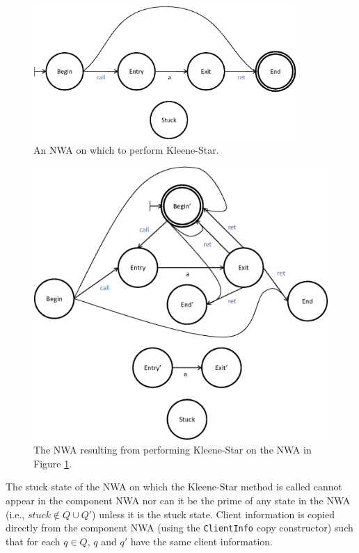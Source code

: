 \documentclass{llncs}
\begin{document}
\begin{figure}[p]
  \centering
    \includegraphics[width=10cm]{Figures/Figure11.eps}
  \caption{An NWA on which to perform Kleene-Star.}
  \label{Fig:Star1}
\end{figure}

\begin{figure}[p]
  \centering
    \includegraphics[width=12cm]{Figures/Figure12.eps}
  \caption{The NWA resulting from performing Kleene-Star on the NWA in Figure \ref{Fig:Star1}.}
  \label{Fig:Star2}
\end{figure}

The stuck state of the NWA on which the Kleene-Star method is called cannot appear in the component NWA nor can it be the prime of any state in the NWA (i.e., $stuck \not\in Q \cup Q'$) unless it is the stuck state.  Client information is copied directly from the component NWA (using the \texttt{ClientInfo} copy constructor) such that for each $q \in Q$, $q$ and $q'$ have the same client information.   
\end{document}
